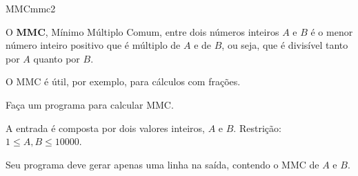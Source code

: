 \documentclass[12pt,a4paper,oneside]{article}
\begin{document}
\begin{problem}{MMC}{mmc}{2}
 
O \textbf{MMC}, Mínimo Múltiplo Comum, entre dois números inteiros $A$ e $B$ é o menor número inteiro positivo que é múltiplo de $A$ e de $B$, ou seja, que é divisível tanto por $A$ quanto por $B$.

O MMC é útil, por exemplo, para cálculos com frações.

Faça um programa para calcular MMC.

%

\InputFile

A entrada é composta por dois valores inteiros, $A$ e $B$. Restrição: $1 \leq A, B \leq 10000$.


\OutputFile

Seu programa deve gerar apenas uma linha na saída, contendo o MMC de $A$ e $B$.


\Example

\begin{example}
%
\end{example}

\begin{example}
%
\end{example}

\begin{example}
%
\end{example}

\begin{example}
%
\end{example}

\begin{example}
%
\end{example}


\end{problem}
\end{document}
